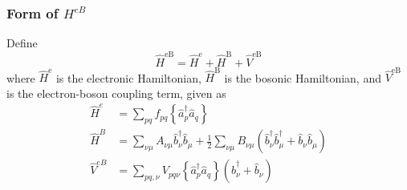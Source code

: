 \begin{frame}
\frametitle{Form of $H^{eB}$}
Define \begin{equation}
\hat{H}^{\mathrm{eB}}=\hat{H}^{\mathrm{e}}+\hat{H}^{\mathrm{B}}+\hat{V}^{\mathrm{eB}}
\end{equation}
where $\hat{H}^{\mathrm{e}}$ is the electronic Hamiltonian, $\hat{H}^{\mathrm{B}}$ is the bosonic Hamiltonian, and $\hat{V}^{\mathrm{eB}}$ is the electron-boson coupling term, given as
\begin{align}
\hat{H}^e&=\sum_{p q} f_{p q}\left\{\hat{a}_p^{\dagger} \hat{a}_q\right\} \\
\hat{H}^{B}&=\sum_{\nu \mu} A_{\nu \mu} \hat{b}_\nu^{\dagger} \hat{b}_\mu+\frac{1}{2} \sum_{\nu \mu} B_{\nu \mu}\left(\hat{b}_\nu^{\dagger} \hat{b}_\mu^{\dagger}+\hat{b}_\nu \hat{b}_\mu\right)
\label{b} \\
\hat{V}^{eB}&=\sum_{p q, \nu} V_{p q \nu}\left\{\hat{a}_p^{\dagger} \hat{a}_q\right\}\left(\hat{b}_\nu^{\dagger}+\hat{b}_\nu\right)
\label{eb}
\end{align}
\end{frame}




